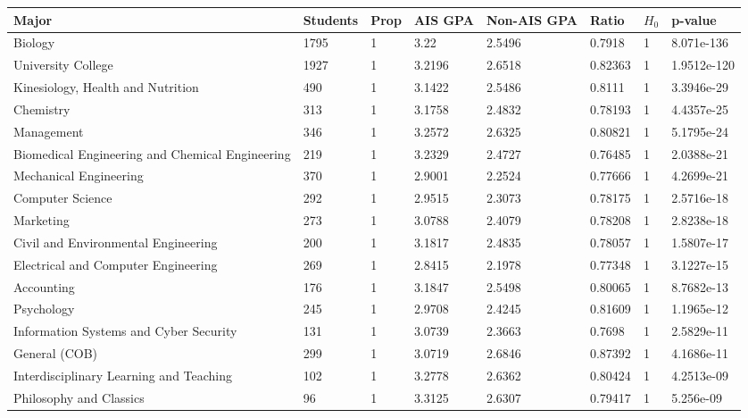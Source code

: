 \newpage

\begin{sidewaystable}
{\scriptsize \ttfamily \begin{longtable}{llllllll}\label{table:AIS}
 \centering 
 \textbf{Major} & \textbf{Students} & \textbf{Prop} & \textbf{AIS GPA} & \textbf{Non-AIS GPA} & \textbf{Ratio} & \textbf{$H_0$} & \textbf{p-value} \\ 
\hline 
Biology & 1795 & 1 & 3.22 & 2.5496 & 0.7918 & 1 & \color{green}8.071e-136 \\ 
University College & 1927 & 1 & 3.2196 & 2.6518 & 0.82363 & 1 & \color{green}1.9512e-120 \\ 
Kinesiology, Health and Nutrition & 490 & 1 & 3.1422 & 2.5486 & 0.8111 & 1 & \color{green}3.3946e-29 \\ 
Chemistry & 313 & 1 & 3.1758 & 2.4832 & 0.78193 & 1 & \color{green}4.4357e-25 \\ 
Management & 346 & 1 & 3.2572 & 2.6325 & 0.80821 & 1 & \color{green}5.1795e-24 \\ 
Biomedical Engineering and Chemical Engineering & 219 & 1 & 3.2329 & 2.4727 & 0.76485 & 1 & \color{green}2.0388e-21 \\ 
Mechanical Engineering & 370 & 1 & 2.9001 & 2.2524 & 0.77666 & 1 & \color{green}4.2699e-21 \\ 
Computer Science & 292 & 1 & 2.9515 & 2.3073 & 0.78175 & 1 & \color{green}2.5716e-18 \\ 
Marketing & 273 & 1 & 3.0788 & 2.4079 & 0.78208 & 1 & \color{green}2.8238e-18 \\ 
Civil and Environmental Engineering & 200 & 1 & 3.1817 & 2.4835 & 0.78057 & 1 & \color{green}1.5807e-17 \\ 
Electrical and Computer Engineering & 269 & 1 & 2.8415 & 2.1978 & 0.77348 & 1 & \color{green}3.1227e-15 \\ 
Accounting & 176 & 1 & 3.1847 & 2.5498 & 0.80065 & 1 & \color{green}8.7682e-13 \\ 
Psychology & 245 & 1 & 2.9708 & 2.4245 & 0.81609 & 1 & \color{green}1.1965e-12 \\ 
Information Systems and Cyber Security & 131 & 1 & 3.0739 & 2.3663 & 0.7698 & 1 & \color{green}2.5829e-11 \\ 
General (COB) & 299 & 1 & 3.0719 & 2.6846 & 0.87392 & 1 & \color{green}4.1686e-11 \\ 
Interdisciplinary Learning and Teaching & 102 & 1 & 3.2778 & 2.6362 & 0.80424 & 1 & \color{green}4.2513e-09 \\ 
Philosophy and Classics & 96 & 1 & 3.3125 & 2.6307 & 0.79417 & 1 & \color{green}5.256e-09 \\ 

\end{longtable}}
\end{sidewaystable}
